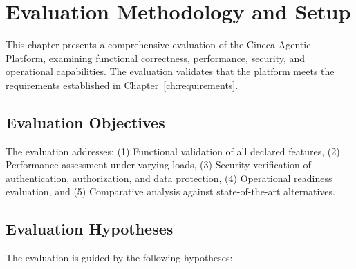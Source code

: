 \documentclass[a4paper,twoside]{sapthesis}
\begin{document}

\section{Evaluation Methodology and Setup}
\label{sec:eval-methodology}

This chapter presents a comprehensive evaluation of the Cineca Agentic Platform, examining functional correctness, performance, security, and operational capabilities. The evaluation validates that the platform meets the requirements established in Chapter~\ref{ch:requirements}.

\subsection{Evaluation Objectives}

The evaluation addresses: (1) Functional validation of all declared features, (2) Performance assessment under varying loads, (3) Security verification of authentication, authorization, and data protection, (4) Operational readiness evaluation, and (5) Comparative analysis against state-of-the-art alternatives.

\subsection{Evaluation Hypotheses}

The evaluation is guided by the following hypotheses:
\end{document}
